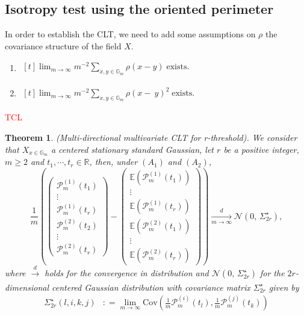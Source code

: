 \documentclass[12pt]{article}
\theoremstyle{Theorem}
\newtheorem{Theorem}{Theorem}[section]
\newcounter{Ax}
\newcommand{\itemA}{%
    \addtocounter{Ax}{1}
    \item[A\theAx.]}
\begin{document}
\subsection{Isotropy test using the oriented perimeter}
In order to establish the CLT, we need to add some assumptions on $\rho$ the covariance structure of the field $X$.
\begin{enumerate}
  \itemA 
 $\begin{aligned}[t]
 \label{conditionTCL1}
\lim_{m \to \infty} m^{-2}\sum_{x, y \in \mathbb{G}_{m}}\rho(x-y)\; \text{exists}.
\end{aligned}$
\itemA $\begin{aligned}[t]
 \lim_{m \to \infty} m^{-2}\sum_{x, y \in \mathbb{G}_{m}}\rho(x-~y)^{2}\; \text{exists}.
\end{aligned}$
\end{enumerate} 
\textcolor{red}{TCL}
\begin{Theorem}\label{TCL}(Multi-directional multivariate CLT for r-threshold). We consider that $X_{x \in \mathbb{G}_{m}}$ a centered stationary standard Gaussian, let $r$ be a positive integer, $m \geq 2$ and $t_{1}, \cdots,t_{r} \in \mathbb{R}$, then, under \textbf{$(A_{1})$} and \textbf{$(A_{2})$},
\begin{equation*}
\frac{1}{m}\left(\begin{pmatrix} \mathcal{P}^{\scriptscriptstyle (1)}_{m}(t_{1}) \\  \vdots \\ \mathcal{P}^{\scriptscriptstyle (1)}_{m}(t_{r}) \\ \mathcal{P}^{\scriptscriptstyle (2)}_{m}(t_{2}) \\  \vdots \\ \mathcal{P}^{\scriptscriptstyle (2)}_{m}(t_{r})  \end{pmatrix} - \begin{pmatrix} \mathbb{E}(\mathcal{P}^{\scriptscriptstyle (1)}_{m}(t_{1}))  \\ \vdots \\ \mathbb{E}(\mathcal{P}^{\scriptscriptstyle (1)}_{m}(t_{r}))\\\mathbb{E}(\mathcal{P}^{\scriptscriptstyle (2)}_{m}(t_{1})) \\ \vdots \\ \mathbb{E}(\mathcal{P}^{\scriptscriptstyle (2)}_{m}(t_{r})) \end{pmatrix}\right) \xrightarrow[m \to \infty]{d} \mathcal{N}\left(0,\,\Sigma_{2r}^{\star}\right),
\end{equation*}
where $\xrightarrow[]{d}$ holds for the convergence in distribution and $\mathcal{N}\left(0,\,\Sigma_{2r}^{\star}\right)$ for the $2r$-dimensional centered Gaussian distribution with covariance matrix $\Sigma^\star_{2r}$ given by
\begin{align*}
\Sigma^{\star}_{2r}(l,i,k,j) & : = \lim_{m \to \infty}\text{Cov}\left(\frac{1}{m}\mathcal{P}^{\scriptscriptstyle (i)}_{m}(t_{l}),  \frac{1}{m}\mathcal{P}^{\scriptscriptstyle (j)}_{m}(t_{k}) \right)
\end{align*}
\end{Theorem}
\end{document}
